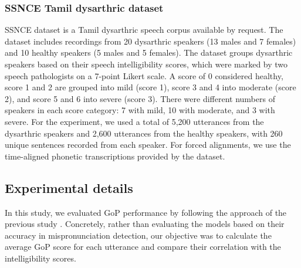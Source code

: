 \subsubsection{SSNCE Tamil dysarthric dataset} \label{sssec:ssnce}
SSNCE dataset \cite{ta2016dysarthric} is a Tamil dysarthric speech corpus available by request. 
The dataset includes recordings from 20 dysarthric speakers (13 males and 7 females) and 10 healthy speakers (5 males and 5 females). 
The dataset groups dysarthric speakers based on their speech intelligibility scores, which were marked by two speech pathologists on a 7-point Likert scale.
A score of 0 considered healthy, score 1 and 2 are grouped into mild (score 1), score 3 and 4 into moderate (score 2), and score 5 and 6 into severe (score 3).
There were different numbers of speakers in each score category: 7 with mild, 10 with moderate, and 3 with severe.
For the experiment, we used a total of 5,200 utterances from the dysarthric speakers and 2,600 utterances from the healthy speakers, with 260 unique sentences recorded from each speaker.
For forced alignments, we use the time-aligned phonetic transcriptions provided by the dataset.


\subsection{Experimental details} \label{ssec:detail}
In this study, we evaluated GoP performance by following the approach of the previous study \cite{Fontan2015PredictingDS}.
Concretely, rather than evaluating the models based on their accuracy in mispronunciation detection, our objective was to calculate the average GoP score for each utterance and compare their correlation with the intelligibility scores.

